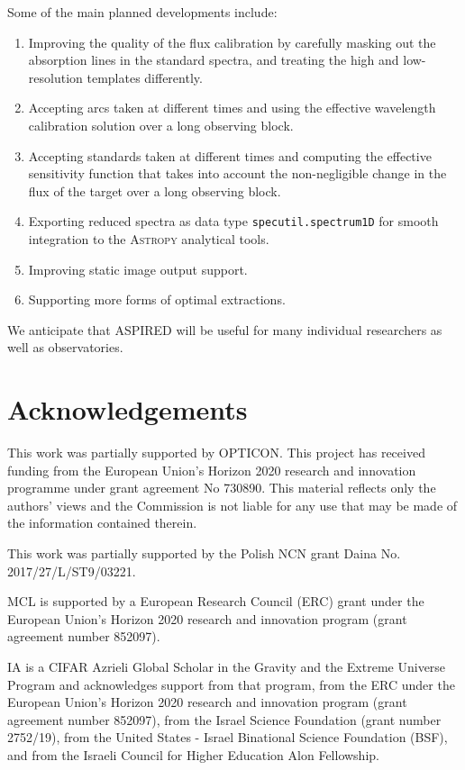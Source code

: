 \documentclass[linenumbers, twocolumn]{aastex631}
\begin{document}
Some of the main planned developments include:
\begin{enumerate}
    \item Improving the quality of the flux calibration by
    carefully masking out the absorption lines in the standard spectra, and
    treating the high and low-resolution templates differently.
    \item Accepting arcs taken at different times and using the effective wavelength
    calibration solution over a long observing block.
    \item Accepting standards taken at different times and computing the effective
    sensitivity function that takes into account the non-negligible change
    in the flux of the target over a long observing block.
    \item Exporting reduced spectra as data type \texttt{specutil.spectrum1D}
    for smooth integration to the \textsc{Astropy} analytical tools.
    \item Improving static image output support.
    \item Supporting more forms of optimal extractions.
\end{enumerate}

We anticipate that ASPIRED will be useful for many individual researchers as well as observatories.

\section*{Acknowledgements}
This work was partially supported by OPTICON. This project has
received funding from the European Union's Horizon 2020 research and
innovation programme under grant agreement No 730890. This material
reflects only the authors' views and the Commission is not liable for
any use that may be made of the information contained therein.

This work was partially supported by the Polish NCN grant Daina
No. 2017/27/L/ST9/03221.

MCL is supported by a European Research Council (ERC) grant under the European Union's Horizon 2020 research and innovation program (grant agreement number 852097).

IA is a CIFAR Azrieli Global Scholar in the Gravity and the Extreme Universe Program and acknowledges support from that program, from the ERC under the European Union's Horizon 2020 research and innovation program (grant agreement number 852097), from the Israel Science Foundation (grant number 2752/19), from the United States - Israel Binational Science Foundation (BSF), and from the Israeli Council for Higher Education Alon Fellowship.
\end{document}
